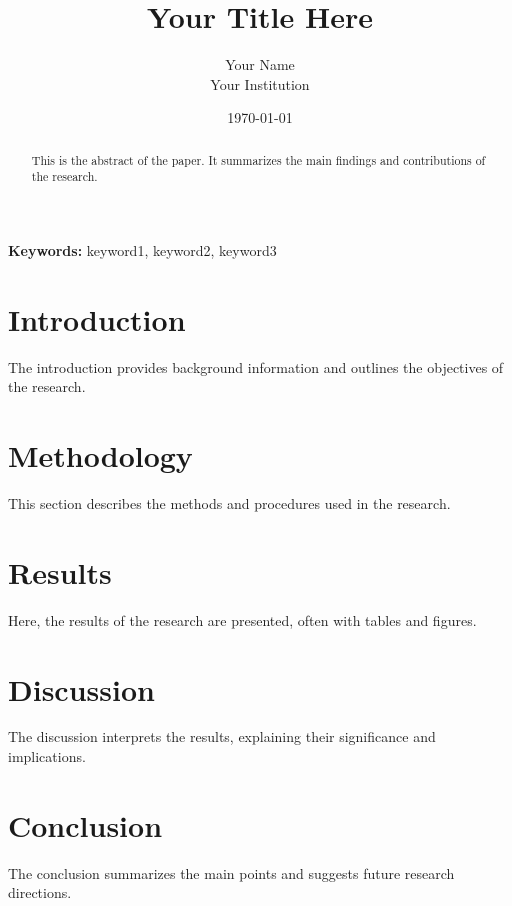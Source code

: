 \documentclass[12pt]{article}
\begin{document}
\title{Your Title Here}
\author{Your Name \\ Your Institution}
\date{\today}
\maketitle

\begin{abstract}
  This is the abstract of the paper. It summarizes the main findings and contributions of the research.
\end{abstract}

\textbf{Keywords:} keyword1, keyword2, keyword3

\section{Introduction}
The introduction provides background information and outlines the objectives of the research.

\section{Methodology}
This section describes the methods and procedures used in the research.

\section{Results}
Here, the results of the research are presented, often with tables and figures.

\section{Discussion}
The discussion interprets the results, explaining their significance and implications.

\section{Conclusion}
The conclusion summarizes the main points and suggests future research directions.



\end{document}

